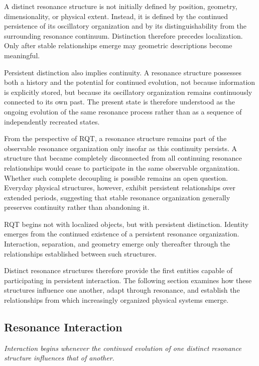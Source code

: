 \documentclass[11pt,a4paper]{article}
\begin{document}
A distinct resonance structure is not initially defined by position, geometry, dimensionality, or physical extent. Instead, it is defined by the continued persistence of its oscillatory organization and by its distinguishability from the surrounding resonance continuum. Distinction therefore precedes localization. Only after stable relationships emerge may geometric descriptions become meaningful.

Persistent distinction also implies continuity. A resonance structure possesses both a history and the potential for continued evolution, not because information is explicitly stored, but because its oscillatory organization remains continuously connected to its own past. The present state is therefore understood as the ongoing evolution of the same resonance process rather than as a sequence of independently recreated states.

From the perspective of RQT, a resonance structure remains part of the observable resonance organization only insofar as this continuity persists. A structure that became completely disconnected from all continuing resonance relationships would cease to participate in the same observable organization. Whether such complete decoupling is possible remains an open question. Everyday physical structures, however, exhibit persistent relationships over extended periods, suggesting that stable resonance organization generally preserves continuity rather than abandoning it.

RQT begins not with localized objects, but with persistent distinction. Identity emerges from the continued existence of a persistent resonance organization. Interaction, separation, and geometry emerge only thereafter through the relationships established between such structures.

Distinct resonance structures therefore provide the first entities capable of participating in persistent interaction. The following section examines how these structures influence one another, adapt through resonance, and establish the relationships from which increasingly organized physical systems emerge.

\subsection{Resonance Interaction}

\emph{Interaction begins whenever the continued evolution of one distinct resonance structure influences that of another.}
\vspace{0.6em} 
\end{document}
